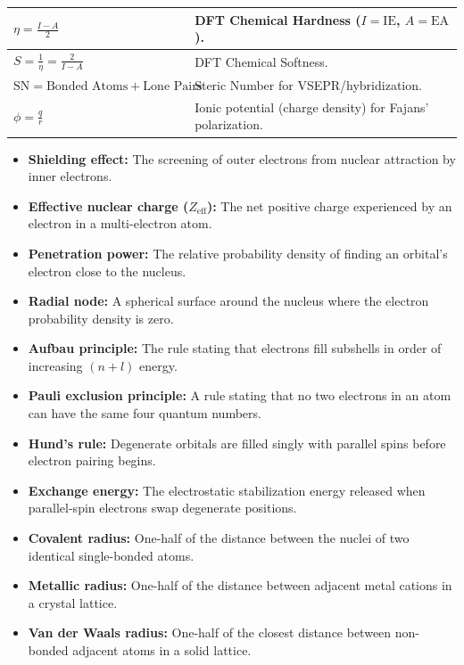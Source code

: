 \documentclass[12pt,a4paper]{article}
\begin{document}
\begin{tcolorbox}[formulabox, breakable, title={Key Formulas at a Glance},
  title after break={\textbf{Key Formulas at a Glance (contd.)}}]
\begin{tabularx}{\linewidth}{|B{4.5cm}|Y|}
\hline
$\eta = \displaystyle\frac{I - A}{2}$ & DFT Chemical Hardness ($I = \text{IE}$, $A = \text{EA}$). \\
\hline
$S = \displaystyle\frac{1}{\eta} = \displaystyle\frac{2}{I - A}$ & DFT Chemical Softness. \\
\hline
$\text{SN} = \text{Bonded Atoms} + \text{Lone Pairs}$ & Steric Number for VSEPR/hybridization. \\
\hline
$\phi = \displaystyle\frac{q}{r}$ & Ionic potential (charge density) for Fajans' polarization. \\
\hline
\end{tabularx}
\end{tcolorbox}

\begin{tcolorbox}[defbox, title={One-Line Definitions}]
\begin{itemize}[leftmargin=*, itemsep=2.pt, topsep=2pt]
  \item \textbf{Shielding effect:} The screening of outer electrons from nuclear attraction by inner electrons.
  \item \textbf{Effective nuclear charge ($Z_{\text{eff}}$):} The net positive charge experienced by an electron in a multi-electron atom.
  \item \textbf{Penetration power:} The relative probability density of finding an orbital's electron close to the nucleus.
  \item \textbf{Radial node:} A spherical surface around the nucleus where the electron probability density is zero.
  \item \textbf{Aufbau principle:} The rule stating that electrons fill subshells in order of increasing $(n+l)$ energy.
  \item \textbf{Pauli exclusion principle:} A rule stating that no two electrons in an atom can have the same four quantum numbers.
  \item \textbf{Hund's rule:} Degenerate orbitals are filled singly with parallel spins before electron pairing begins.
  \item \textbf{Exchange energy:} The electrostatic stabilization energy released when parallel-spin electrons swap degenerate positions.
  \item \textbf{Covalent radius:} One-half of the distance between the nuclei of two identical single-bonded atoms.
  \item \textbf{Metallic radius:} One-half of the distance between adjacent metal cations in a crystal lattice.
  \item \textbf{Van der Waals radius:} One-half of the closest distance between non-bonded adjacent atoms in a solid lattice.

\end{itemize}
\end{tcolorbox}
\end{document}

